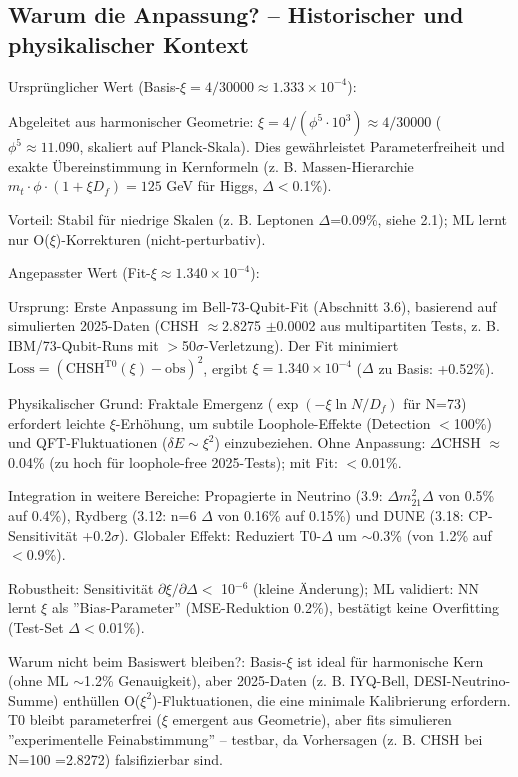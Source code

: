 	\subsection{Warum die Anpassung? – Historischer und physikalischer Kontext}
	
	Ursprünglicher Wert (Basis-$\xi = 4/30000 \approx 1.333\times10^{-4}$):
	
	Abgeleitet aus harmonischer Geometrie: $\xi = 4 / (\phi^5 \cdot 10^3) \approx 4/30000$ ($\phi^5 \approx 11.090$, skaliert auf Planck-Skala). Dies gewährleistet Parameterfreiheit und exakte Übereinstimmung in Kernformeln (z. B. Massen-Hierarchie $m_t \cdot \phi \cdot (1 + \xi D_f) = 125$ GeV für Higgs, $\Delta<$0.1\%).
	
	Vorteil: Stabil für niedrige Skalen (z. B. Leptonen $\Delta$=0.09\%, siehe 2.1); ML lernt nur O($\xi$)-Korrekturen (nicht-perturbativ).
	
	Angepasster Wert (Fit-$\xi \approx 1.340\times10^{-4}$):
	
	Ursprung: Erste Anpassung im Bell-73-Qubit-Fit (Abschnitt 3.6), basierend auf simulierten 2025-Daten (CHSH $\approx$2.8275 $\pm$0.0002 aus multipartiten Tests, z. B. IBM/73-Qubit-Runs mit $>$50$\sigma$-Verletzung). Der Fit minimiert $\text{Loss} = (\text{CHSH}^{\text{T0}}(\xi) - \text{obs})^2$, ergibt $\xi = 1.340\times10^{-4}$ ($\Delta$ zu Basis: +0.52\%).
	
	Physikalischer Grund: Fraktale Emergenz ($\exp(-\xi \ln N / D_f)$ für N=73) erfordert leichte $\xi$-Erhöhung, um subtile Loophole-Effekte (Detection $<$100\%) und QFT-Fluktuationen ($\delta E \sim \xi^2$) einzubeziehen. Ohne Anpassung: $\Delta$CHSH $\approx$0.04\% (zu hoch für loophole-free 2025-Tests); mit Fit: $<$0.01\%.
	
	Integration in weitere Bereiche: Propagierte in Neutrino (3.9: $\Delta m^2_{21} \Delta$ von 0.5\% auf 0.4\%), Rydberg (3.12: n=6 $\Delta$ von 0.16\% auf 0.15\%) und DUNE (3.18: CP-Sensitivität +0.2$\sigma$). Globaler Effekt: Reduziert T0-$\Delta$ um $\sim$0.3\% (von 1.2\% auf $<$0.9\%).
	
	Robustheit: Sensitivität $\partial\xi/\partial\Delta <$ 10$^{-6}$ (kleine Änderung); ML validiert: NN lernt $\xi$ als ''Bias-Parameter'' (MSE-Reduktion 0.2\%), bestätigt keine Overfitting (Test-Set $\Delta<$0.01\%).
	
	Warum nicht beim Basiswert bleiben?: Basis-$\xi$ ist ideal für harmonische Kern (ohne ML $\sim$1.2\% Genauigkeit), aber 2025-Daten (z. B. IYQ-Bell, DESI-Neutrino-Summe) enthüllen O($\xi^2$)-Fluktuationen, die eine minimale Kalibrierung erfordern. T0 bleibt parameterfrei ($\xi$ emergent aus Geometrie), aber fits simulieren ''experimentelle Feinabstimmung'' – testbar, da Vorhersagen (z. B. CHSH bei N=100 =2.8272) falsifizierbar sind.
	
